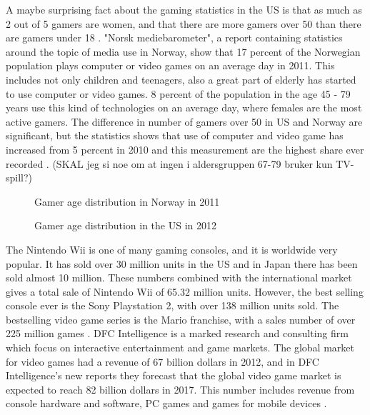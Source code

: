 A maybe surprising fact about the gaming statistics in the US is that as much as 2 out of 5 gamers are women, and that there are more gamers over 50 than there are gamers under 18 \cite{statistics2012}. "Norsk mediebarometer", a report containing statistics around the topic of media use in Norway, show that 17 percent of the Norwegian population plays computer or video games on an average day in 2011. This includes not only children and teenagers, also a great part of elderly has started to use computer or video games. 8 percent of the population in the age 45 - 79 years use this kind of technologies on an average day, where females are the most active gamers. The difference in number of gamers over 50 in US and Norway are significant, but the statistics shows that use of computer and video game has increased from 5 percent in 2010 and this measurement are the highest share ever recorded \cite{ssb2010} \cite{ssb2011}. (SKAL jeg si noe om at ingen i aldersgruppen 67-79 bruker kun TV-spill?)        

\begin{figure}
\label{fig:gamersNorway}
\begin{center}
\caption[Video games in general]{Gamer age distribution in Norway in 2011 \cite{ssb2011}}
\end{center}
\end{figure}

\begin{figure}
\label{fig:gamersUS}
\begin{center}
\caption[Video games in general]{Gamer age distribution in the US in 2012 \cite{ssb2011}}
\end{center}
\end{figure}


The Nintendo Wii is one of many gaming consoles, and it is worldwide very popular. It has sold over 30 million units in the US and in Japan there has been sold almost 10 million. These numbers combined with the international market gives a total sale of Nintendo Wii of 65.32 million units. However, the best selling console ever is the Sony Playstation 2, with over 138 million units sold. The bestselling video game series is the Mario franchise, with a sales number of over 225 million games \cite{statistics2012}. DFC Intelligence is a marked research and consulting firm which focus on interactive entertainment and game markets. The global market for video games had a revenue of 67 billion dollars in 2012, and in DFC Intelligence's new reports they forecast that the global video game market is expected to reach 82 billion dollars in 2017. This number includes revenue from console hardware and software, PC games and games for mobile devices \cite{videogameforcast} \cite{aboutdfcint}.

